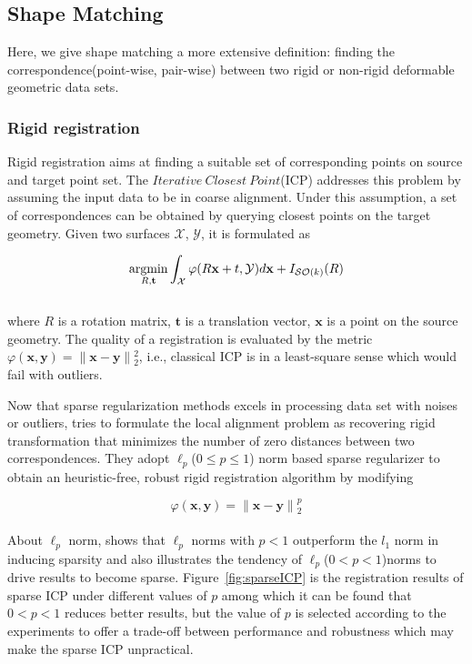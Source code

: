\subsection{Shape Matching}
\label{subsec:Shape Matching}


Here, we give shape matching a more extensive definition: finding the correspondence(point-wise, pair-wise) between two rigid or non-rigid deformable geometric data sets.

\subsubsection{Rigid registration}
\label{subsubsec:Rigid registration}

Rigid registration aims at finding a suitable set of corresponding points on source and target point set.
The $Iterative~Closest~Point$(ICP) addresses this problem by assuming the input data to be in coarse alignment.
Under this assumption, a set of correspondences can be obtained by querying closest points on the target geometry.
Given two surfaces $\mathcal{X}$, $\mathcal{Y}$, it is formulated as

\small{
\begin{equation}
 \label{eq:ICP}
 \mathop{\operatorname*{argmin}}_{R,\mathbf{t}}\int_{\mathcal{X}}^{}\varphi(R\mathbf{x}+t,\mathcal{Y})d\mathbf{x}+I_{\mathcal{SO}(k)}(R)
\end{equation}
}
\\
where $R$ is a rotation matrix,
$\mathbf{t}$ is a translation vector,
$\mathbf{x}$ is a point on the source geometry.
The quality of a registration is evaluated by the metric
$\varphi(\mathbf{x},\mathbf{y})=\|\mathbf{x}-\mathbf{y}\|{_2^2}$, i.e.,
classical ICP is in a least-square sense which would fail with outliers.

Now that sparse regularization methods excels in processing data set with noises or outliers,
\cite{bouaziz2013sparse} tries to formulate the local alignment problem as recovering rigid transformation that minimizes the number of zero distances between two correspondences.
They adopt $\ell_{p}$($0\le p\le1$) norm based sparse regularizer to obtain an heuristic-free, robust rigid registration algorithm by modifying

\small{
\begin{equation}
 \label{eq:permutedsparse}
 \varphi(\mathbf{x},\mathbf{y})=\|\mathbf{x}-\mathbf{y}\|{_2^{p}}
\end{equation}
}
\\
About $\ell_{p}$ norm, \cite{chartrand2007exact} shows that $\ell_{p}$ norms with $p<1$ outperform the $l_1$ norm in inducing sparsity and \cite{elad2010sparse} also illustrates the tendency of $\ell_{p}$($0<p<1$)norms to drive results to become sparse.
Figure~\ref{fig:sparseICP} is the registration results of sparse ICP under different values of $p$ among which it can be found that $0<p<1$ reduces better results,
but the value of $p$ is selected according to the experiments to offer a trade-off between performance and robustness which may make the sparse ICP unpractical.

